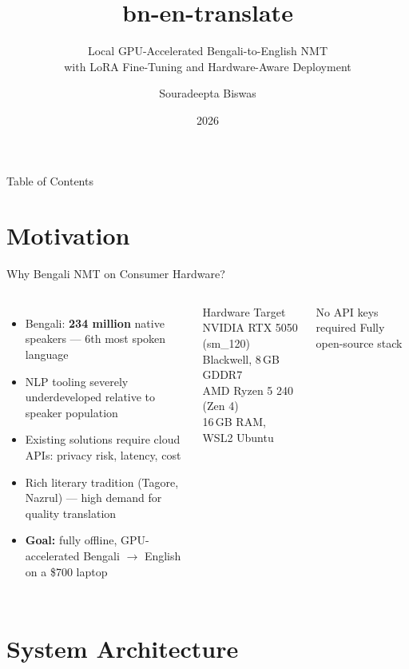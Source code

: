 \documentclass[aspectratio=169,10pt]{beamer}
\title{bn-en-translate}
\subtitle{Local GPU-Accelerated Bengali-to-English NMT\\
with LoRA Fine-Tuning and Hardware-Aware Deployment}
\author{Souradeepta Biswas}
\institute{M.S. Computer Science, Syracuse University \\ Independent Researcher}
\date{2026}
\begin{document}
\begin{frame}
  \titlepage
\end{frame}

\begin{frame}{Table of Contents}
  \tableofcontents
\end{frame}

\section{Motivation}

\begin{frame}{Why Bengali NMT on Consumer Hardware?}
  \begin{columns}
    \begin{itemize}
      \item Bengali: \textbf{234 million} native speakers --- 6th most spoken language
      \item NLP tooling severely underdeveloped relative to speaker population
      \item Existing solutions require cloud APIs: privacy risk, latency, cost
      \item Rich literary tradition (Tagore, Nazrul) --- high demand for quality translation
      \item \textbf{Goal:} fully offline, GPU-accelerated Bengali $\to$ English on a \$700 laptop
    \end{itemize}
    \begin{block}{Hardware Target}
      NVIDIA RTX 5050 (sm\_120)\\
      Blackwell, 8\,GB GDDR7\\
      AMD Ryzen 5 240 (Zen 4)\\
      16\,GB RAM, WSL2 Ubuntu
    \end{block}
    \vspace{0.3cm}
    \begin{alertblock}{No API keys required}
      Fully open-source stack
    \end{alertblock}
  \end{columns}
\end{frame}

\section{System Architecture}
\end{document}
